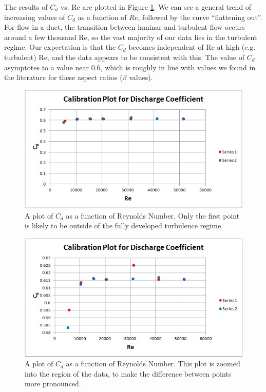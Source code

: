 \documentclass{article}
\begin{document}
The results of $C_d$ vs. Re are plotted in Figure \ref{orif}. We can see a general trend of increasing 
values of $C_d$ as a function of $Re$, followed by the curve ``flattening out''. For flow in a duct, 
the transition between laminar and turbulent flow occurs around a few thousand Re, so the vast majority 
of our data lies in the turbulent regime. Our expectation is that the $C_d$ becomes independent of Re at high 
(e.g. turbulent) Re, and the data appears to be consistent with this. The value of $C_d$ asymptotes to a value near 0.6, which is roughly in line with values we found in the literature for these aspect ratios ($\beta$ values).

  \begin{figure}[!htb]
   \begin{center}
    \includegraphics[width = 12 cm]{figs/cd_v_re_zero_axis.jpg}
    \caption{A plot of $C_d$ as a function of Reynolds Number. Only the first point is likely to be 
outside of the fully developed turbulence regime. }
    \label{orif}
   \end{center}
  \end{figure}

  \begin{figure}[!htb]
   \begin{center}
    \includegraphics[width = 12 cm]{figs/cd_v_re.jpg}
    \caption{A plot of $C_d$ as a function of Reynolds Number. This plot is zoomed into the region of the data, 
    to make the difference between points more pronounced.}
    \label{orif-zoom}
   \end{center}
  \end{figure}
\end{document}
